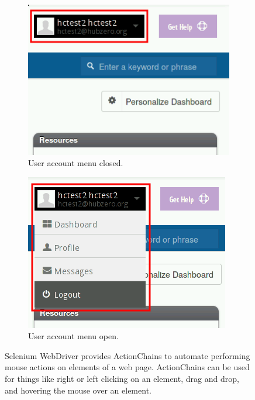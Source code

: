 \begin{figure}[htb]
        \centering
        \begin{subfigure}[b]{0.48\linewidth}
                \centering
                \includegraphics[width=\linewidth]{../../images/eps/nciphub_user_account_menu_closed.png}
                \caption{User account menu closed.}
                \label{fig:user_account_menu_closed}
        \end{subfigure}
        \begin{subfigure}[b]{0.48\linewidth}
                \centering
                \includegraphics[width=\linewidth]{../../images/eps/nciphub_user_account_menu_open.png}
                \caption{User account menu open.}
                \label{fig:user_account_menu_open}
        \end{subfigure}
        \caption{Selenium WebDriver provides ActionChains to automate
                 performing mouse actions on elements of a web page.
                 ActionChains can be used for things like right or
                 left clicking on an element, drag and drop, and
                 hovering the mouse over an element.}
        \label{fig:action_chains_javascript_logout}
\end{figure}

